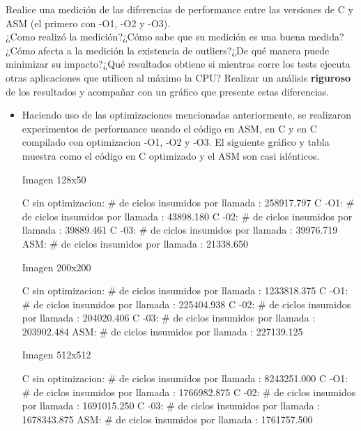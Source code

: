 	Realice una medición de las diferencias de performance entre las versiones
	de C y ASM (el primero con -O1, -O2 y -O3).\\
	¿Como realizó la medición?¿Cómo sabe que su medición es una buena medida?¿Cómo afecta a la medición la existencia de outliers?¿De qué manera puede minimizar su impacto?¿Qué resultados obtiene si mientras corre los tests ejecuta otras aplicaciones que utilicen al máximo la CPU? 
	Realizar un análisis \textbf{riguroso} de los resultados y acompañar con un gráfico que presente estas diferencias.
	\vspace*{0.3cm} \noindent
	\begin{itemize}
	 \item Haciendo uso de las optimizaciones mencionadas anteriormente, se realizaron experimentos de performance usando el c\'odigo en ASM, en C y en C 
	  compilado con optimizacion -O1, -O2 y -O3. El siguiente gr\'afico y tabla muestra como el c\'odigo en C optimizado y el ASM son casi id\'enticos.	

Imagen 128x50\newline

C sin optimizacion:   \# de ciclos insumidos por llamada : 258917.797 \newline
C -O1:    \# de ciclos insumidos por llamada : 43898.180 \newline
C -02:    \# de ciclos insumidos por llamada : 39889.461 \newline
C -03:  \# de ciclos insumidos por llamada : 39976.719 \newline
ASM:  \# de ciclos insumidos por llamada : 21338.650 \newline


Imagen 200x200\newline

C sin optimizacion: \# de ciclos insumidos por llamada : 1233818.375\newline
C -O1:   \# de ciclos insumidos por llamada : 225404.938\newline
C -02: \# de ciclos insumidos por llamada : 204020.406\newline
C -03:  \# de ciclos insumidos por llamada : 203902.484\newline
ASM: \# de ciclos insumidos por llamada : 227139.125\newline

Imagen 512x512\newline

C sin optimizacion:   \# de ciclos insumidos por llamada : 8243251.000\newline
C -O1:   \# de ciclos insumidos por llamada : 1766982.875\newline
C -02: \# de ciclos insumidos por llamada : 1691015.250\newline
C -03:  \# de ciclos insumidos por llamada : 1678343.875\newline
ASM:  \# de ciclos insumidos por llamada : 1761757.500\newline


\end{itemize}
